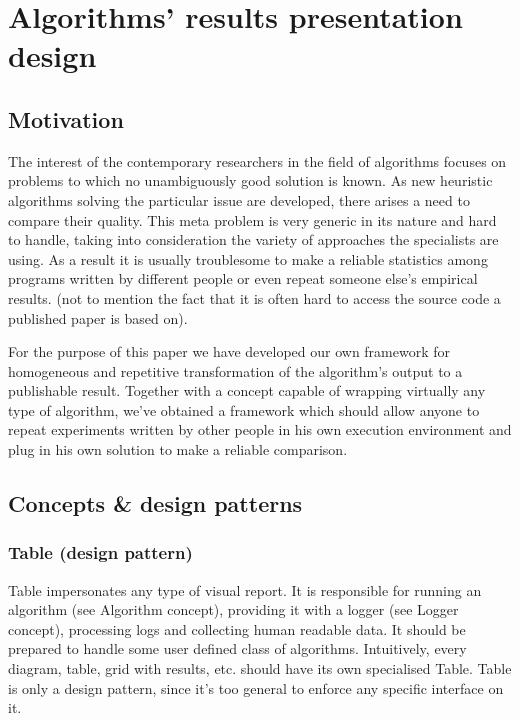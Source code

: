 \chapter{Algorithms' results presentation design}
\section{Motivation}

The interest of the contemporary researchers in the field of algorithms 
focuses on problems to which no unambiguously good solution is known. As new heuristic algorithms solving the
particular issue are developed, there arises a need to compare their
quality. This meta problem is very generic in its nature and hard to handle,
taking into consideration the variety of approaches the specialists are using.
As a result it is usually troublesome to make a reliable statistics among programs
written by different people or even repeat someone else's empirical results. (not to mention
the fact that it is often hard to access the source code a published paper is
based on).

For the purpose of this paper we have developed our own framework
for homogeneous and repetitive transformation of the algorithm's output to a
publishable result. Together with a concept capable of wrapping virtually any
type of algorithm, we've obtained a framework which should allow anyone to
repeat experiments written by other people in his own execution environment
and plug in his own solution to make a reliable comparison.

\section{Concepts \& design patterns}

\subsection{Table (design pattern)}

Table impersonates any type of visual report.
It is responsible for running an algorithm (see Algorithm concept), providing
it with a logger (see Logger concept), processing logs and collecting human
readable data. It should be prepared to handle some user defined class of
algorithms. Intuitively, every diagram, table, grid with results, etc. should
have its own specialised Table. Table is only a design pattern, since it's too
general to enforce any specific interface on it.

